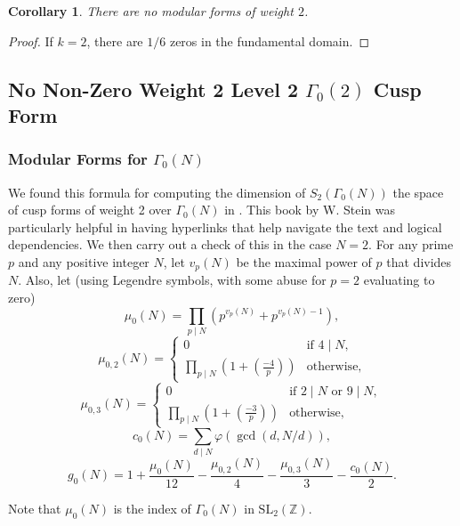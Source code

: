 \documentclass{article}
\newtheorem{cor}{Corollary}[section]
\theoremstyle{definition}
\theoremstyle{definition}
\theoremstyle{definition}
\begin{document}
\begin{cor}
     There are no modular forms of weight $2$.
\end{cor}
\begin{proof}
If $k=2$, there are $1/6$ zeros in the fundamental domain.
    
\end{proof}






\subsection{No Non-Zero Weight 2 Level 2 $\Gamma_0(2)$ Cusp Form}

\subsubsection{Modular Forms for \( \Gamma_0(N) \)}

We found this formula for computing the dimension of $S_2(\Gamma_0(N))$ the space of cusp forms of weight 2 over $\Gamma_0(N)$ in \cite{wstein}. This book by W. Stein was particularly helpful in having hyperlinks that help navigate the text and logical dependencies.
\newline\newline
We then carry out a check of this in the case $N=2$.
\newline\newline
For any prime \( p \) and any positive integer \( N \), let \( v_p(N) \) be the maximal power of \( p \) that divides \( N \). Also, let (using Legendre symbols, with some abuse for $p=2$ evaluating to zero)
\[
\mu_0(N) = \prod_{p \mid N} \left(p^{v_p(N)} + p^{v_p(N)-1}\right),
\]
\[
\mu_{0,2}(N) = 
\begin{cases}
0 & \text{if } 4 \mid N, \\
\prod_{p \mid N} \left(1 + \left( \frac{-4}{p} \right) \right) & \text{otherwise},
\end{cases}
\]
\[
\mu_{0,3}(N) = 
\begin{cases}
0 & \text{if } 2 \mid N \text{ or } 9 \mid N, \\
\prod_{p \mid N} \left(1 + \left( \frac{-3}{p} \right) \right) & \text{otherwise},
\end{cases}
\]
\[
c_0(N) = \sum_{d \mid N} \varphi(\gcd(d, N/d)),
\]
\[
g_0(N) = 1 + \frac{\mu_0(N)}{12} - \frac{\mu_{0,2}(N)}{4} - \frac{\mu_{0,3}(N)}{3} - \frac{c_0(N)}{2}.
\]

Note that \( \mu_0(N) \) is the index of \( \Gamma_0(N) \) in \( \mathrm{SL}_2(\mathbb{Z}) \).
\end{document}
